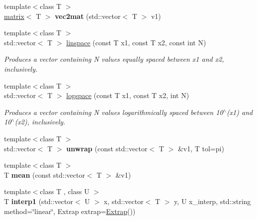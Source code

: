 \begin{DoxyCompactItemize}
\item 
\hypertarget{namespacekeycpp_a4d3ef9b10b3db438529bafc5e74fa0dc}{{\footnotesize template$<$class T $>$ }\\\hyperlink{classkeycpp_1_1matrix}{matrix}$<$ T $>$ {\bfseries vec2mat} (std\-::vector$<$ T $>$ v1)}\label{namespacekeycpp_a4d3ef9b10b3db438529bafc5e74fa0dc}

\item 
{\footnotesize template$<$class T $>$ }\\std\-::vector$<$ T $>$ \hyperlink{namespacekeycpp_ab57eee495c93eb18ebf8c8ccf4d44e74}{linspace} (const T x1, const T x2, const int N)
\begin{DoxyCompactList}\small\item\em Produces a vector containing N values equally spaced between x1 and x2, inclusively. \end{DoxyCompactList}\item 
{\footnotesize template$<$class T $>$ }\\std\-::vector$<$ T $>$ \hyperlink{namespacekeycpp_ac92462e3b25414144d4e45fc269d2f13}{logspace} (const T x1, const T x2, int N)
\begin{DoxyCompactList}\small\item\em Produces a vector containing N values logarithmically spaced between 10$^\wedge$(x1) and 10$^\wedge$(x2), inclusively. \end{DoxyCompactList}\item 
\hypertarget{namespacekeycpp_a4e350b4b11ea4d9962b4daa13cc66e32}{{\footnotesize template$<$class T $>$ }\\std\-::vector$<$ T $>$ {\bfseries unwrap} (const std\-::vector$<$ T $>$ \&v1, T tol=pi)}\label{namespacekeycpp_a4e350b4b11ea4d9962b4daa13cc66e32}

\item 
\hypertarget{namespacekeycpp_ad1acd03db6a49523cb5dbe751a80917a}{{\footnotesize template$<$class T $>$ }\\T {\bfseries mean} (const std\-::vector$<$ T $>$ \&v1)}\label{namespacekeycpp_ad1acd03db6a49523cb5dbe751a80917a}

\item 
\hypertarget{namespacekeycpp_a123211086c4953fe9346acc22b2a67f9}{{\footnotesize template$<$class T , class U $>$ }\\T {\bfseries interp1} (std\-::vector$<$ U $>$ x, std\-::vector$<$ T $>$ y, U x\-\_\-interp, std\-::string method=\char`\"{}linear\char`\"{}, Extrap extrap=\hyperlink{classkeycpp_1_1_extrap}{Extrap}())}\label{namespacekeycpp_a123211086c4953fe9346acc22b2a67f9}


\end{DoxyCompactItemize}
